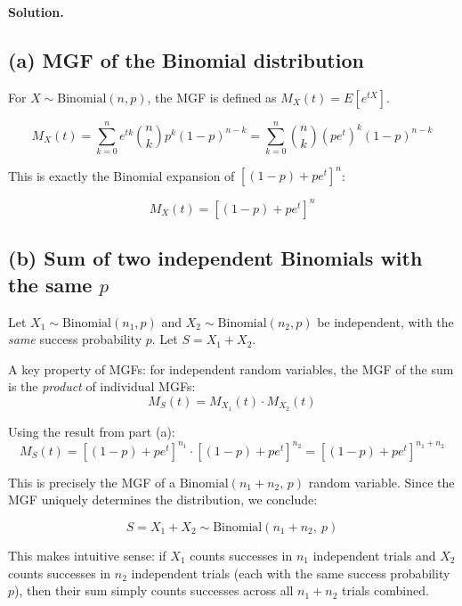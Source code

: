 \documentclass[11pt]{article}
\newcommand{\soln}{\par\noindent\textcolor{acolor}{\textbf{Solution.}}\quad}
\begin{document}
\soln

\subsection*{(a) MGF of the Binomial distribution}

For $X \sim \text{Binomial}(n,p)$, the MGF is defined as $M_X(t) = E[e^{tX}]$.

\[
M_X(t) = \sum_{k=0}^{n} e^{tk}\binom{n}{k}p^k(1-p)^{n-k}
= \sum_{k=0}^{n}\binom{n}{k}(pe^t)^k(1-p)^{n-k}
\]

This is exactly the Binomial expansion of $\left[(1-p) + pe^t\right]^n$:

\[
\boxed{M_X(t) = \left[(1-p) + pe^t\right]^n}
\]

\subsection*{(b) Sum of two independent Binomials with the same $p$}

Let $X_1 \sim \text{Binomial}(n_1, p)$ and $X_2 \sim \text{Binomial}(n_2,p)$ be independent, with the \emph{same} success probability $p$. Let $S = X_1+X_2$.

A key property of MGFs: for independent random variables, the MGF of the sum is the \emph{product} of individual MGFs:
\[
M_S(t) = M_{X_1}(t)\cdot M_{X_2}(t)
\]

Using the result from part (a):
\[
M_S(t) = \left[(1-p)+pe^t\right]^{n_1} \cdot \left[(1-p)+pe^t\right]^{n_2} = \left[(1-p)+pe^t\right]^{n_1+n_2}
\]

This is precisely the MGF of a $\text{Binomial}(n_1+n_2,\,p)$ random variable. Since the MGF uniquely determines the distribution, we conclude:

\[
\boxed{S = X_1+X_2 \sim \text{Binomial}(n_1+n_2,\ p)}
\]

This makes intuitive sense: if $X_1$ counts successes in $n_1$ independent trials and $X_2$ counts successes in $n_2$ independent trials (each with the same success probability $p$), then their sum simply counts successes across all $n_1+n_2$ trials combined.
\end{document}
